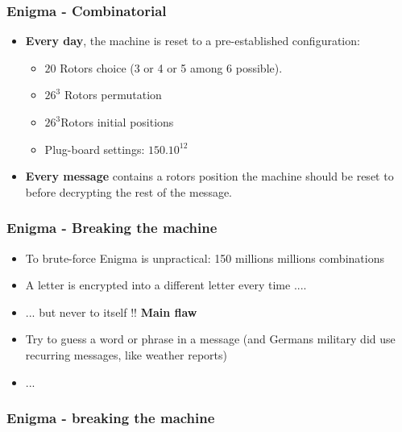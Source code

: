 \documentclass[
hyperref={pdfpagelabels=false}
,xcolor=table
]
{beamer}
\begin{document}
\begin{frame}
  \frametitle{Enigma - Combinatorial}
  \begin{itemize}
  \item \textbf{Every day}, the machine is reset to a pre-established configuration:
    \begin{itemize}
    \item $20$ Rotors choice (3 or 4 or 5 among 6 possible). 
    \item $26^3$ Rotors permutation 
    \item  $26^3$Rotors initial positions 
    \item Plug-board settings: $150.10^{12}$
    \end{itemize}
  \item \textbf{Every message} contains a rotors position the machine
    should be reset to before decrypting the rest of the message.
  \end{itemize}  
\end{frame}

\begin{frame}
  \frametitle{Enigma - Breaking the machine}

  \begin{itemize}
  \item To brute-force Enigma is unpractical: 150 millions millions combinations
  \item A letter is encrypted into a different letter every time ....
  \item ... but never to itself !! \textbf{Main flaw}
  \item Try to guess a word or phrase in a message (and Germans military did use recurring messages, like weather reports)
  \item ... 
  \end{itemize}

\end{frame}

\begin{frame} 
  \frametitle{Enigma - breaking the machine}
  \begin{center}
  \end{center}
\end{frame}
\end{document}
